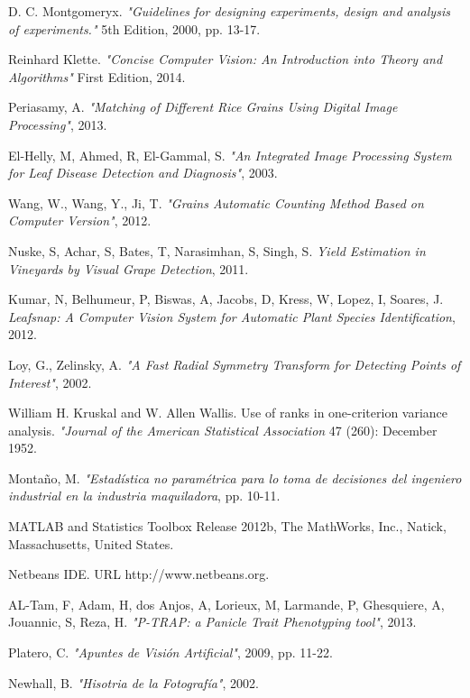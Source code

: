 \begin{thebibliography}{9}
D. C. Montgomeryx.
\textit{"Guidelines for designing experiments, design and analysis of experiments."} 5th Edition, 2000, pp. 13-17.

Reinhard Klette.
\textit{"Concise Computer Vision: An Introduction into Theory and Algorithms"} First Edition, 2014.

Periasamy, A. 
\textit{"Matching of Different Rice Grains Using Digital Image Processing"}, 2013.

El-Helly, M, Ahmed, R, El-Gammal, S. 
\textit{"An Integrated Image Processing System for Leaf Disease Detection and Diagnosis"}, 2003.

Wang, W., Wang, Y., Ji, T. 
\textit{"Grains Automatic Counting Method Based on Computer Version"}, 2012.

Nuske, S, Achar, S, Bates, T, Narasimhan, S, Singh, S.
\textit{Yield Estimation in Vineyards by Visual Grape Detection}, 2011.

Kumar, N, Belhumeur, P, Biswas, A, Jacobs, D, Kress, W, Lopez, I, Soares, J.
\textit{Leafsnap: A Computer Vision System for Automatic Plant Species Identification}, 2012.

Loy, G., Zelinsky, A. 
\textit{"A Fast Radial Symmetry Transform for Detecting Points of Interest"}, 2002.

William H. Kruskal and W. Allen Wallis. 
Use of ranks in one-criterion variance analysis. \textit{"Journal of the American Statistical Association} 47 (260): December 1952.

Monta\~no, M. 
\textit{"Estad\'istica no param\'etrica para lo toma de decisiones del ingeniero industrial en la industria maquiladora}, pp. 10-11.

MATLAB and Statistics Toolbox Release 2012b, The MathWorks, Inc., Natick, Massachusetts, United States.

Netbeans IDE. URL http://www.netbeans.org.

AL-Tam, F, Adam, H, dos Anjos, A, Lorieux, M, Larmande, P, Ghesquiere, A, Jouannic, S, Reza, H. \textit{"P-TRAP: a Panicle Trait Phenotyping tool"}, 2013.

Platero, C.
\textit{"Apuntes de Visi\'on Artificial"}, 2009, pp. 11-22.

Newhall, B.
\textit{"Hisotria de la Fotograf\'ia"}, 2002.
\end{thebibliography}